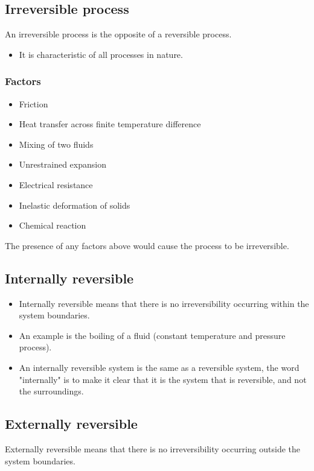 \documentclass[11pt]{article}
\begin{document}
\subsection{Irreversible process}
\label{sec:org48a73a5}
An irreversible process is the opposite of a reversible process.
\begin{itemize}
\item It is characteristic of all processes in nature.
\end{itemize}

\subsubsection{Factors}
\label{sec:orgdccd0bc}
\begin{itemize}
\item Friction
\item Heat transfer across finite temperature difference
\item Mixing of two fluids
\item Unrestrained expansion
\item Electrical resistance
\item Inelastic deformation of solids
\item Chemical reaction
\end{itemize}

The presence of any factors above would cause the process to be irreversible.

\subsection{Internally reversible}
\label{sec:org03763c0}
\begin{itemize}
\item Internally reversible means that there is no irreversibility occurring within the system boundaries.
\item An example is the boiling of a fluid (constant temperature and pressure process).
\item An internally reversible system is the same as a reversible system, the word "internally" is to make it clear that it is the system that is reversible, and not the surroundings.
\end{itemize}

\subsection{Externally reversible}
\label{sec:org95d63f0}
Externally reversible means that there is no irreversibility occurring outside the system boundaries.
\end{document}

